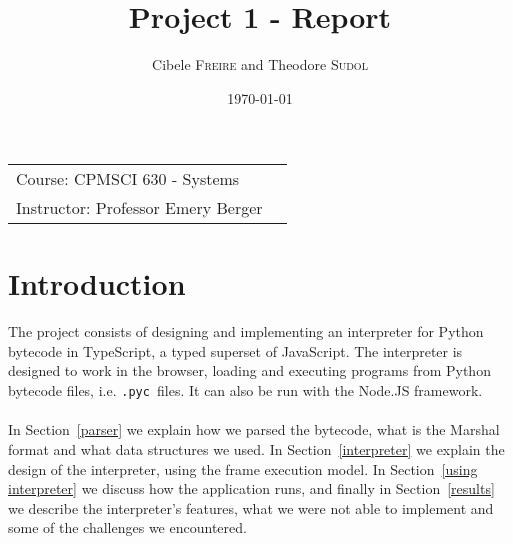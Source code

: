 \documentclass{article}
\title{Project 1 - Report} %
\author{Cibele \textsc{Freire} and Theodore \textsc{Sudol}} %
\date{\today} %
\newcommand{\pyc}{\texttt{.pyc~}}
\begin{document}

\maketitle %

\begin{center}
\begin{tabular}{l r}
Course: CPMSCI 630 - Systems \\
Instructor: Professor Emery Berger %
\end{tabular}
\end{center}





\section{Introduction}\label{intro}

\paragraph{}
The project consists of designing and implementing an interpreter for Python bytecode in TypeScript, a typed superset of JavaScript. The interpreter is designed to work in the browser, loading and executing programs from Python bytecode files, i.e. \pyc files. It can also be run with the Node.JS framework.

\paragraph{}
In Section~\ref{parser} we explain how we parsed the bytecode, what is the Marshal format and what data structures we used. In Section~\ref{interpreter} we explain the design of the interpreter, using the frame execution model. In Section~\ref{using interpreter} we discuss how the application runs, and finally in Section~\ref{results} we describe the interpreter's features, what we were not able to implement and some of the challenges we encountered.
\end{document}
